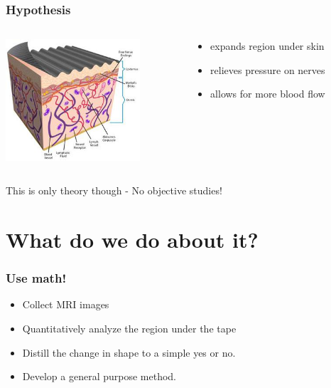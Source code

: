 \documentclass{beamer} %
\theoremstyle{definition} %
\begin{document}
\begin{frame}
\frametitle{Hypothesis}


\begin{columns} %

\begin{column}{0.5\textwidth} %
\includegraphics[width=5cm]{../images/k-tape-infographic.jpg} %

\end{column}

\begin{column}{0.5\textwidth} %
\begin{itemize}
\item expands region under skin
\item relieves pressure on nerves
\item allows for more blood flow
\end{itemize}
\end{column}


\end{columns}

\begin{center}
\pause 
{\Large This is only theory though - No objective studies! }
\end{center}
\end{frame}


\section{What do we do about it?} %

\begin{frame}
\frametitle{Use math!}

\begin{itemize}
\item Collect MRI images
\item Quantitatively analyze the region under the tape
\item Distill the change in shape to a simple yes or no.
\item Develop a general purpose method.
\end{itemize}
\end{frame}
\end{document}
